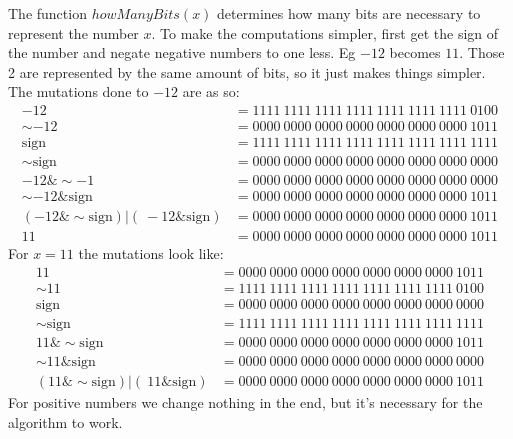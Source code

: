 \documentclass[11pt]{report}
\begin{document}
The function $howManyBits(x)$ determines how many bits are necessary to represent the number $x$. To make the computations simpler, first get the sign of the number and negate negative numbers to one less. Eg $-12$ becomes $11$. Those 2 are represented by the same amount of bits, so it just makes things simpler. The mutations done to $-12$ are as so:
\begin{align*}
    -12 &= 1111\ 1111\ 1111\ 1111\ 1111\ 1111\ 1111\ 0100\\
    \sim-12 &= 0000\ 0000\ 0000\ 0000\ 0000\ 0000\ 0000\ 1011\\
    \text{sign}  &= 1111\ 1111\ 1111\ 1111\ 1111\ 1111\ 1111\ 1111\\
    \sim\text{sign} &= 0000\ 0000\ 0000\ 0000\ 0000\ 0000\ 0000\ 0000\\
    -12 \& \sim-1 &= 0000\ 0000\ 0000\ 0000\ 0000\ 0000\ 0000\ 0000\\
    \sim-12 \& \text{sign} &= 0000\ 0000\ 0000\ 0000\ 0000\ 0000\ 0000\ 1011\\
    (-12 \& \sim\text{sign}) | (~-12 \& \text{sign}) &= 0000\ 0000\ 0000\ 0000\ 0000\ 0000\ 0000\ 1011\\
    11  &= 0000\ 0000\ 0000\ 0000\ 0000\ 0000\ 0000\ 1011
\end{align*}
For $x=11$ the mutations look like:
\begin{align*}
    11 &= 0000\ 0000\ 0000\ 0000\ 0000\ 0000\ 0000\ 1011\\
    \sim11 &= 1111\ 1111\ 1111\ 1111\ 1111\ 1111\ 1111\ 0100\\
    \text{sign} &= 0000\ 0000\ 0000\ 0000\ 0000\ 0000\ 0000\ 0000\\
    \sim\text{sign} &= 1111\ 1111\ 1111\ 1111\ 1111\ 1111\ 1111\ 1111\\
    11 \& \sim\text{sign} &= 0000\ 0000\ 0000\ 0000\ 0000\ 0000\ 0000\ 1011\\
    \sim11 \& \text{sign} &= 0000\ 0000\ 0000\ 0000\ 0000\ 0000\ 0000\ 0000\\
    (11 \& \sim\text{sign}) | (~11 \& \text{sign}) &= 0000\ 0000\ 0000\ 0000\ 0000\ 0000\ 0000\ 1011
\end{align*}
For positive numbers we change nothing in the end, but it's necessary for the algorithm to work.\\[1ex]
\end{document}
